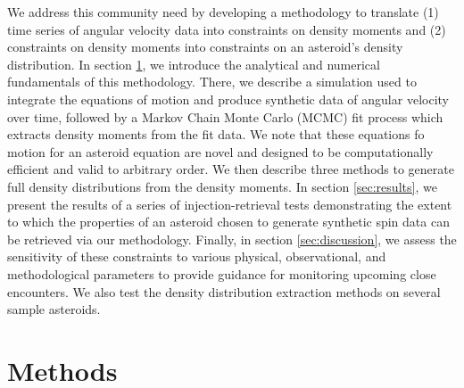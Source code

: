 \documentclass[fleqn,usenatbib]{mnras}
\begin{document}
We address this community need by developing a methodology to translate (1) time series of angular velocity data into constraints on density moments and (2) constraints on density moments into constraints on an asteroid's density distribution. In section \ref{sec:methods}, we introduce the analytical and numerical fundamentals of this methodology. There, we describe a simulation used to integrate the equations of motion and produce synthetic data of angular velocity over time, followed by a Markov Chain Monte Carlo (MCMC) fit process which  extracts density moments from the fit data. We note that these equations fo motion for an asteroid equation are novel and designed to be computationally efficient and valid to arbitrary order. We then describe three methods to generate full density distributions from the density moments. In section \ref{sec:results}, we present the results of a series of injection-retrieval tests demonstrating the extent to which the properties of an asteroid chosen to generate synthetic spin data can be retrieved via our methodology. Finally, in section \ref{sec:discussion}, we assess the sensitivity of these constraints to various physical, observational, and methodological parameters to provide guidance for monitoring upcoming close encounters. We also test the density distribution extraction methods on several sample asteroids.





\section{Methods}
\label{sec:methods}
\end{document}
